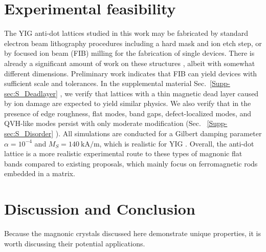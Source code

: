 \documentclass[aps,prx,twocolumn,superscriptaddress,floatfix]{revtex4-2}
\begin{document}

\section{Experimental feasibility}
The YIG anti-dot lattices studied in this work may be fabricated by standard electron beam lithography procedures including a hard mask and ion etch step, or by focused ion beam (FIB) milling for the fabrication of single devices. There is already a significant amount of work on these structures \cite{neusser_anisotropic_2010, ulrichs_magnonic_2010, bali_high-symmetry_2012, gros_phase_2021, wang_observation_2023}, albeit with somewhat different dimensions. Preliminary work indicates that FIB can yield devices with sufficient scale and tolerances. In the supplemental material Sec.~\ref{Supp-sec:S_Deadlayer} \cite{Supplemental}, we verify that lattices with a thin magnetic dead layer caused by ion damage are expected to yield similar physics. We also verify that in the presence of edge roughness, flat modes, band gaps, defect-localized modes, and QVH-like modes persist with only moderate modification (Sec. ~\ref{Supp-sec:S_Disorder} \cite{Supplemental}). All simulations are conducted for a Gilbert damping parameter $\alpha=10^{-4}$ and $M_{S}=\SI{140}{\kilo  \ampere / \meter}$, which is realistic for YIG \cite{dubs_low_2020,li_epitaxial_2015}. Overall, the anti-dot lattice is a more realistic experimental route to these types of magnonic flat bands compared to existing proposals, which mainly focus on ferromagnetic rods embedded in a matrix\cite{centala_compact_2023, liang_dirac_2024,yang_flatbands_2025}.

\section{Discussion and Conclusion}
Because the magnonic crystals discussed here demonstrate unique properties, it is worth discussing their potential applications.
\end{document}

